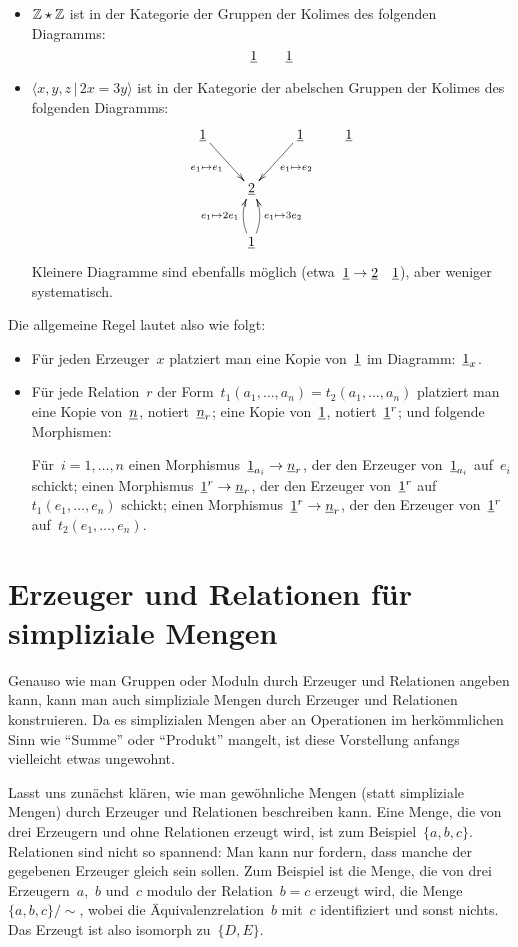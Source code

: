 \documentclass{uebblatt}
\begin{document}
\begin{itemize}
\item $\mathbb{Z} \star \mathbb{Z}$ ist in der Kategorie der Gruppen der Kolimes des
folgenden Diagramms:
\[ \underline{1} \qquad \underline{1} \]
\item $\langle x,y,z \,|\, 2x = 3y \rangle$ ist in der Kategorie der abelschen
Gruppen der Kolimes des folgenden Diagramms:
\[ \xymatrix{
  \ul{1} \ar[rd]_{e_1 \mapsto e_1} && \ul{1} \ar[ld]^{e_1 \mapsto e_2} & \ul{1} \\
  & \ul{2} \\
  & \ul{1} \ar@/^/[u]^{e_1 \mapsto 2e_1} \ar@/_/[u]_{e_1 \mapsto 3e_2}
} \]
Kleinere Diagramme sind ebenfalls möglich (etwa~$\underline{1} \to \underline{2} \quad
\underline{1}$), aber weniger systematisch.
\end{itemize}

Die allgemeine Regel lautet also wie folgt:
\begin{itemize}
\item Für jeden Erzeuger~$x$ platziert man eine Kopie von~$\underline{1}$ im
Diagramm:~$\underline{1}_x$.
\item Für jede Relation~$r$ der Form~$t_1(a_1,\ldots,a_n) =
t_2(a_1,\ldots,a_n)$ platziert man eine Kopie von~$\underline{n}$,
notiert~$\underline{n}_r$; eine Kopie von~$\underline{1}$, notiert~$\underline{1}^r$; und
folgende Morphismen:

Für~$i=1,\ldots,n$ einen Morphismus~$\underline{1}_{a_i} \to \underline{n}_r$, der
den Erzeuger von~$\underline{1}_{a_i}$ auf~$e_i$ schickt; einen
Morphismus~$\underline{1}^r \to \underline{n}_r$, der den Erzeuger von~$\underline{1}^r$
auf~$t_1(e_1,\ldots,e_n)$ schickt; einen Morphismus~$\underline{1}^r \to \underline{n}_r$,
der den Erzeuger von~$\underline{1}^r$ auf~$t_2(e_1,\ldots,e_n)$.
\end{itemize}


\section*{Erzeuger und Relationen für simpliziale Mengen}

Genauso wie man Gruppen oder Moduln durch Erzeuger und Relationen angeben kann,
kann man auch simpliziale Mengen durch Erzeuger und Relationen konstruieren.
Da es simplizialen Mengen aber an Operationen im herkömmlichen Sinn wie
"`Summe"' oder "`Produkt"' mangelt, ist diese Vorstellung anfangs vielleicht
etwas ungewohnt.

Lasst uns zunächst klären, wie man gewöhnliche Mengen (statt simpliziale
Mengen) durch Erzeuger und Relationen beschreiben kann. Eine Menge, die von
drei Erzeugern und ohne Relationen erzeugt wird, ist zum Beispiel~$\{ a,b,c
\}$. Relationen sind nicht so spannend: Man kann nur fordern, dass manche der
gegebenen Erzeuger gleich sein sollen. Zum Beispiel ist die Menge, die von drei
Erzeugern~$a$,~$b$ und~$c$ modulo der Relation~$b = c$ erzeugt wird, die
Menge~$\{ a,b,c \}/{\sim}$, wobei die Äquivalenzrelation~$b$ mit~$c$
identifiziert und sonst nichts. Das Erzeugt ist also isomorph zu~$\{ D,E \}$.
\end{document}
